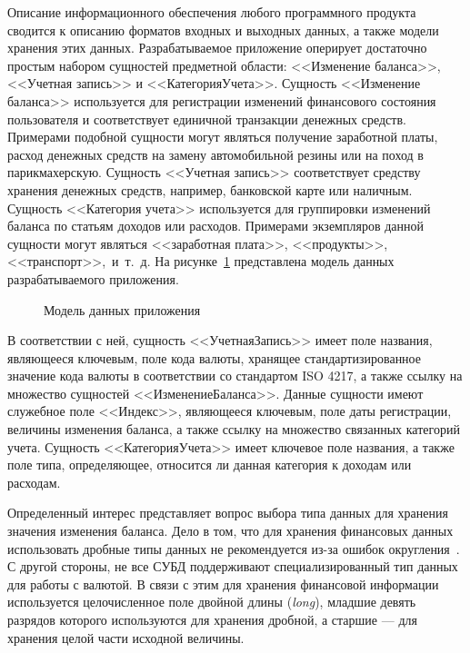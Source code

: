 Описание информационного обеспечения любого программного продукта сводится
к описанию форматов входных и выходных данных, а также модели хранения
этих данных.
Разрабатываемое приложение оперирует достаточно простым набором сущностей
предметной области: <<Изменение баланса>>, <<Учетная запись>> и <<КатегорияУчета>>.
Сущность <<Изменение баланса>> используется для регистрации изменений
финансового состояния пользователя и соответствует единичной транзакции
денежных средств.
Примерами подобной сущности могут являться получение заработной платы,
расход денежных средств на замену автомобильной резины или на поход в
парикмахерскую.
Сущность <<Учетная запись>> соответствует средству хранения денежных
средств, например, банковской карте или наличным.
Сущность <<Категория учета>> используется для группировки изменений баланса
по статьям доходов или расходов. Примерами экземпляров данной сущности
могут являться <<заработная плата>>, <<продукты>>, <<транспорт>>,~и~т.~д.
На рисунке~\ref{fig:design_entities} представлена модель данных
разрабатываемого приложения.

\begin{figure}[h!]
  \centering
  \caption{Модель данных приложения}
  \label{fig:design_entities}
\end{figure}

В соответствии с ней, сущность <<УчетнаяЗапись>> имеет поле названия,
являющееся ключевым, поле кода валюты, хранящее стандартизированное значение
кода валюты в соответствии со стандартом ISO 4217,
а также ссылку на множество сущностей <<ИзменениеБаланса>>.
Данные сущности имеют служебное поле <<Индекс>>,
являющееся ключевым, поле даты регистрации, величины изменения баланса,
а также ссылку на множество связанных категорий учета.
Сущность <<КатегорияУчета>> имеет ключевое поле названия, а также поле типа,
определяющее, относится ли данная категория к доходам или расходам.

Определенный интерес представляет вопрос выбора типа данных для хранения
значения изменения баланса. Дело в том, что для хранения финансовых данных
использовать дробные типы данных не рекомендуется
из-за ошибок округления~\cite{bloch08}. С другой стороны, не все СУБД
поддерживают специализированный тип данных для работы с валютой.
В связи с этим для хранения финансовой информации используется целочисленное
поле двойной длины (\textit{long}), младшие девять разрядов которого используются
для хранения дробной, а старшие --- для хранения целой части
исходной величины.

